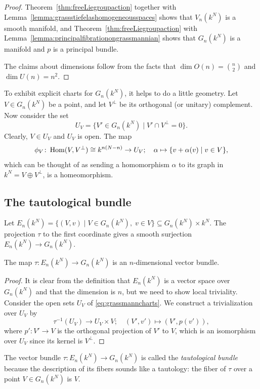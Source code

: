 \documentclass[a4paper,openany]{scrbook}
\begin{document}
\begin{proof}
Theorem~\ref{thm:freeLiegroupaction} together with Lemma~\ref{lemma:grassstiefelashomogeneousspaces} shows that $V_n(k^N)$ is a smooth manifold, and Theorem~\ref{thm:freeLiegroupaction} with Lemma~\ref{lemma:principalfibrationongrassmannian} shows that $G_n(k^N)$ is a manifold and $p$ is a principal bundle.

The claims about dimensions follow from the facts that $\dim O(n) = {n \choose 2}$ and $\dim U(n) = n^2$.
\end{proof}

To exhibit explicit charts for $G_n(k^N)$, it helps to do a little geometry. Let $V \in G_n(k^N)$ be a point, and let $V^\perp$ be its orthogonal (or unitary) complement. Now consider the set
\begin{equation}\label{eq:grassmanncharts}
U_V = \{ V' \in G_n(k^N) \mid V' \cap V^\perp = 0\}.
\end{equation}
Clearly, $V \in U_V$ and $U_V$ is open. The map
\[
\phi_V\colon \operatorname{Hom}(V,V^\perp) \cong k^{n(N-n)} \to U_V; \quad \alpha \mapsto \{v+\alpha(v) \mid v \in V\},
\]
which can be thought of as sending a homomorphism $\alpha$ to its graph in $k^N = V \oplus V^\perp$, is a homeomorphism.

\subsection{The tautological bundle}

Let $E_n(k^N) = \{ (V,v) \mid V \in G_n(k^N), \; v \in V \} \subseteq G_n(k^N) \times k^N$. The projection $\tau$ to the first coordinate gives a smooth surjection $E_n(k^N) \to G_n(k^N)$.

\begin{prop}
The map $\tau\colon E_n(k^N) \to G_n(k^N)$ is an $n$-dimensional vector bundle.
\end{prop}
\begin{proof}
It is clear from the definition that $E_n(k^N)$ is a vector space over $G_n(k^N)$ and that the dimension is $n$, but we need to show local triviality. Consider the open sets $U_V$ of \eqref{eq:grassmanncharts}. We construct a trivialization over $U_V$ by
\[
\tau^{-1}(U_V) \to U_V \times V; \quad (V',v') \mapsto (V',p(v')),
\]
where $p'\colon V' \to V$ is the orthogonal projection of $V'$ to $V$, which is an isomorphism over $U_V$ since its kernel is $V^\perp$.
\end{proof}

The vector bundle $\tau\colon E_n(k^N) \to G_n(k^N)$ is called the \emph{tautological bundle} because the description of its fibers sounds like a tautology: the fiber of $\tau$ over a point $V \in G_n(k^N)$ is $V$.
\end{document}
